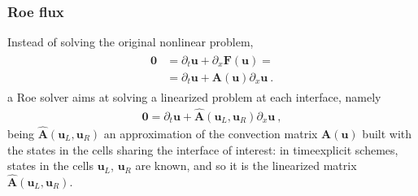 \documentclass[letterpaper,10pt,english]{jupyterBook}
\begin{document}
\subsubsection{Roe flux}
\label{\detokenize{ch/pde/fvm-hyperbolic-pde:roe-flux}}\label{\detokenize{ch/pde/fvm-hyperbolic-pde:pde-fvm-hyperbolic-flux-roe}}
\sphinxAtStartPar
Instead of solving the original non\sphinxhyphen{}linear problem,
\begin{equation*}
\begin{split}\begin{aligned}
  \mathbf{0} 
  & = \partial_t \mathbf{u} + \partial_x \mathbf{F}(\mathbf{u}) = \\
  & = \partial_t \mathbf{u} + \mathbf{A}(\mathbf{u}) \partial_x \mathbf{u} \ .
\end{aligned}\end{split}
\end{equation*}
\sphinxAtStartPar
a Roe solver aims at solving a linearized problem at each interface, namely
\begin{equation*}
\begin{split}\mathbf{0} = \partial_t \mathbf{u} + \hat{\mathbf{A}}(\mathbf{u}_L, \mathbf{u}_R) \partial_x \mathbf{u} \ ,\end{split}
\end{equation*}
\sphinxAtStartPar
being \(\hat{\mathbf{A}}(\mathbf{u}_L, \mathbf{u}_R)\) an approximation of the convection matrix \(\mathbf{A}(\mathbf{u})\) built with the states in the cells sharing the interface of interest: in time\sphinxhyphen{}explicit schemes, states in the cells \(\mathbf{u}_L\), \(\mathbf{u}_R\) are known, and so it is the linearized matrix \(\hat{\mathbf{A}}(\mathbf{u}_L, \mathbf{u}_R)\).
\end{document}
